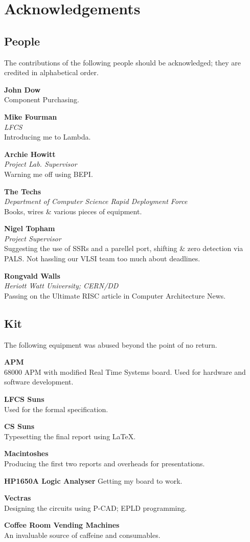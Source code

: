 
\chapter{Acknowledgements}

\section{People}
The contributions of the following people should be acknowledged;
they are credited in alphabetical order.

{\bf John Dow\\}
Component Purchasing.


{\bf Mike Fourman\\}
{\em LFCS}\\
Introducing me to Lambda.

{\bf Archie Howitt}\\
{\em Project Lab. Supervisor}\\
Warning me off using BEPI.

{\bf The Techs}\\
{\em Department of Computer Science Rapid Deployment Force}\\
Books, wires \& various pieces of equipment.

{\samepage
{\bf Nigel Topham}\\
{\em Project Supervisor}\\
Suggesting the use of SSRs and a parellel port, shifting \& zero detection via PALS.
Not hassling our VLSI team too much about deadlines.
}

{\bf Rongvald Walls}\\
{\em Heriott Watt University; CERN/DD}\\
Passing on the Ultimate RISC article in Computer Architecture News.

\section{Kit}
The following equipment was abused beyond the point of no return.

{\bf APM}\\
68000 APM with modified Real Time Systems board.
Used for hardware and software development.

{\bf LFCS Suns}\\
Used for the formal specification.

{\bf CS Suns}\\
Typesetting the final report using \LaTeX.

{\bf Macintoshes}\\
Producing the first two reports and overheads for presentations.

{\bf HP1650A Logic Analyser}
Getting my board to work.

{\bf Vectras}\\
Designing the circuits using P-CAD; EPLD programming.

{\bf Coffee Room Vending Machines}\\
An invaluable source of caffeine and consumables.











